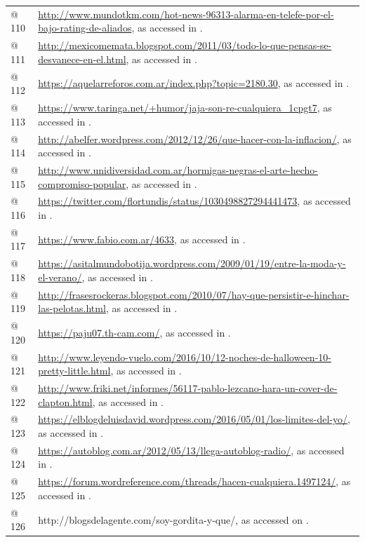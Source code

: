 \documentclass[output=paper]{langscibook}
\begin{document}
\begin{tabularx}{\textwidth}{XX}
@ 110 & \url{http://www.mundotkm.com/hot-news-96313-alarma-en-telefe-por-el-bajo-rating-de-aliados}, as accessed in \citealt{March2017}.\\
@ 111 & \url{http://mexicomemata.blogspot.com/2011/03/todo-lo-que-pensas-se-desvanece-en-el.html}, as accessed in \citealt{November2020}.\\
@ 112 & \url{https://aquelarreforos.com.ar/index.php?topic=2180.30}, as accessed in \citealt{December2020}.\\
@ 113 & \url{https://www.taringa.net/+humor/jaja-son-re-cualquiera_1cpgt7}, as accessed in \citealt{June2021}.\\
@ 114 & \url{http://abelfer.wordpress.com/2012/12/26/que-hacer-con-la-inflacion/}, as accessed in \citealt{November2020}.\\
@ 115 & \url{http://www.unidiversidad.com.ar/hormigas-negras-el-arte-hecho-compromiso-popular}, as accessed in \citealt{November2020}.\\
@ 116 & \url{https://twitter.com/flortundis/status/1030498827294441473}, as accessed in \citealt{June2021}.\\
@ 117 & \url{https://www.fabio.com.ar/4633}, as accessed in \citealt{November2020}.\\
@ 118 & \url{https://asitalmundobotija.wordpress.com/2009/01/19/entre-la-moda-y-el-verano/}, as accessed in \citealt{November2020}.\\
@ 119 & \url{http://frasesrockeras.blogspot.com/2010/07/hay-que-persistir-e-hinchar-las-pelotas.html}, as accessed in \citealt{November2020}.\\
@ 120 & \url{https://paju07.th-cam.com/}, as accessed in \citealt{November2020}.\\
@ 121 & \url{http://www.leyendo-vuelo.com/2016/10/12-noches-de-halloween-10-pretty-little.html}, as accessed in \citealt{November2020}.\\
@ 122 & \url{http://www.friki.net/informes/56117-pablo-lezcano-hara-un-cover-de-clapton.html}, as accessed in \citealt{November2020}.\\
@ 123 & \url{https://elblogdeluisdavid.wordpress.com/2016/05/01/los-limites-del-yo/}, as accessed in \citealt{November2020}.\\
@ 124 & \url{https://autoblog.com.ar/2012/05/13/llega-autoblog-radio/}, as accessed in \citealt{November2020}.\\
@ 125 & \url{https://forum.wordreference.com/threads/hacen-cualquiera.1497124/}, as accessed in \citealt{November2020}.\\
@ 126 & http://blogsdelagente.com/soy-gordita-y-que/, as accessed on \citealt{March2017}.\\

\end{tabularx}
\end{document}
